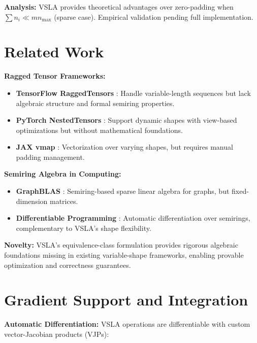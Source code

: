 \documentclass[11pt]{article}
\begin{document}
\textbf{Analysis:} VSLA provides theoretical advantages over zero-padding when $\sum n_i \ll mn_{\max}$ (sparse case). Empirical validation pending full implementation.

\section{Related Work}  
\label{sec:related}

\textbf{Ragged Tensor Frameworks:}
\begin{itemize}[leftmargin=1.5em]
\item \textbf{TensorFlow RaggedTensors} \cite{TF2019}: Handle variable-length sequences but lack algebraic structure and formal semiring properties.
\item \textbf{PyTorch NestedTensors} \cite{PyTorch2021}: Support dynamic shapes with view-based optimizations but without mathematical foundations.
\item \textbf{JAX vmap} \cite{JAX2020}: Vectorization over varying shapes, but requires manual padding management.
\end{itemize}

\textbf{Semiring Algebra in Computing:}
\begin{itemize}[leftmargin=1.5em]  
\item \textbf{GraphBLAS} \cite{GraphBLAS2019}: Semiring-based sparse linear algebra for graphs, but fixed-dimension matrices.
\item \textbf{Differentiable Programming} \cite{Innes2019}: Automatic differentiation over semirings, complementary to VSLA's shape flexibility.
\end{itemize}

\textbf{Novelty:} VSLA's equivalence-class formulation provides rigorous algebraic foundations missing in existing variable-shape frameworks, enabling provable optimization and correctness guarantees.

\section{Gradient Support and Integration}  
\label{sec:autograd}

\textbf{Automatic Differentiation:} VSLA operations are differentiable with custom vector-Jacobian products (VJPs):
\end{document}
